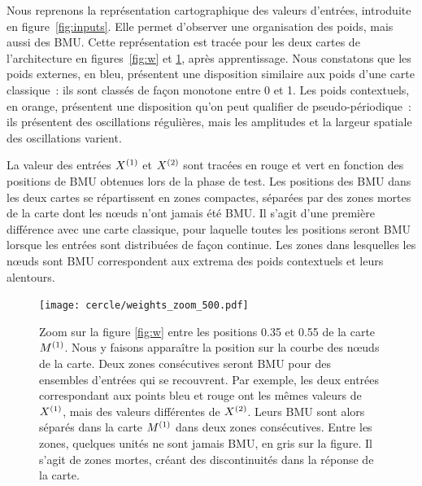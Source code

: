 \documentclass[../main]{subfiles}
\begin{document}
Nous reprenons la représentation cartographique des valeurs d'entrées, introduite en figure~\ref{fig:inputs}. Elle permet d'observer une organisation des poids, mais aussi des BMU.
Cette représentation est tracée pour les deux cartes de l'architecture en figures~\ref{fig:w} et \ref{fig:w_zoom}, après apprentissage.
Nous constatons que les poids externes, en bleu, présentent une disposition similaire aux poids d'une carte classique~: ils sont classés de façon monotone entre 0 et 1. Les poids contextuels, en orange, présentent une disposition qu'on peut qualifier de pseudo-périodique~: ils présentent des oscillations régulières, mais les amplitudes et la largeur spatiale des oscillations varient.

La valeur des entrées $X^{({1})}$ et $X^{({2})}$ sont tracées en rouge et vert en fonction des positions de BMU obtenues lors de la phase de test.
Les positions des BMU dans les deux cartes se répartissent en zones compactes, séparées par des zones mortes de la carte dont les n\oe{}uds n'ont jamais été BMU. 
Il s'agit d'une première différence avec une carte classique, pour laquelle toutes les positions seront BMU lorsque les entrées sont distribuées de façon continue. Les zones dans lesquelles les n\oe{}uds sont BMU correspondent aux extrema des poids contextuels et leurs alentours.


\begin{figure}
	\centering\texttt{[image: cercle/weights\_zoom\_500.pdf]}
   \caption{Zoom sur la figure \ref{fig:w} entre les positions 0.35 et 0.55 de la carte $M^{({1})}$. 
   Nous y faisons apparaître la position sur la courbe des n\oe{}uds de la carte.
   Deux zones consécutives seront BMU pour des ensembles d'entrées qui se recouvrent. Par exemple, les deux entrées correspondant aux points bleu et rouge ont les mêmes valeurs de $X^{({1})}$, mais des valeurs différentes de $X^{({2})}$. Leurs BMU sont alors séparés dans la carte $M^{({1})}$ dans deux zones consécutives.
   Entre les zones, quelques unités ne sont jamais BMU, en gris sur la figure. Il s'agit de zones mortes, créant des discontinuités dans la réponse de la carte.
   \label{fig:w_zoom}}
\end{figure}
\end{document}
